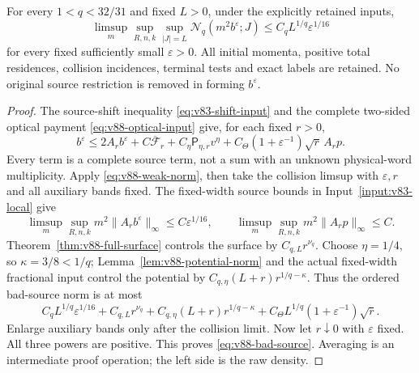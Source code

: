 \begin{theorem}
\label{thm:v88-bad-source}
For every $1<q<32/31$ and fixed $L>0$, under the explicitly
retained inputs,
\begin{equation}\label{eq:v88-bad-source}
 \limsup_m\sup_{R,n,k}\sup_{|J|=L}
         \mathcal N_q(m^2b^\varepsilon;J)
                           \le C_q L^{1/q}\varepsilon^{1/16}
\end{equation}
for every fixed sufficiently small $\varepsilon>0$. All initial
momenta, positive total residences, collision incidences, terminal
tests and exact labels are retained. No original source restriction
is removed in forming $b^\varepsilon$.
\end{theorem}
\begin{proof}
The source-shift inequality \eqref{eq:v83-shift-input} and the
complete two-sided optical payment \eqref{eq:v88-optical-input}
give, for each fixed $r>0$,
\[
 b^\varepsilon\le 2A_rb^\varepsilon
       +C\overline{\mathcal F}_r+C_\eta\mathsf P_{\eta,r}v^\eta
       +C_\Theta(1+\varepsilon^{-1})\sqrt r\,A_rp.
\]
Every term is a complete source term, not a sum with an unknown
physical-word multiplicity. Apply \eqref{eq:v88-weak-norm}, then
take the collision limsup with $\varepsilon,r$ and all auxiliary
bands fixed. The fixed-width source bounds in
Input~\ref{input:v83-local} give
\[
 \limsup_m\sup_{R,n,k}m^2\|A_rb^\varepsilon\|_\infty
 \le C\varepsilon^{1/16},\qquad
 \limsup_m\sup_{R,n,k}m^2\|A_rp\|_\infty\le C.
\]
Theorem~\ref{thm:v88-full-surface} controls the surface by
$C_{q,L}r^{\nu_q}$. Choose $\eta=1/4$, so $\kappa=3/8<1/q$;
Lemma~\ref{lem:v88-potential-norm} and the actual fixed-width
fractional input control the potential by
$C_{q,\eta}(L+r)r^{1/q-\kappa}$. Thus the ordered bad-source
norm is at most
\[
 C_qL^{1/q}\varepsilon^{1/16}
 +C_{q,L}r^{\nu_q}
 +C_{q,\eta}(L+r)r^{1/q-\kappa}
 +C_\Theta L^{1/q}(1+\varepsilon^{-1})\sqrt r.
\]
Enlarge auxiliary bands only after the collision limit. Now let
$r\downarrow0$ with $\varepsilon$ fixed. All three powers are
positive. This proves \eqref{eq:v88-bad-source}. Averaging is an
intermediate proof operation; the left side is the raw density.
\end{proof}

